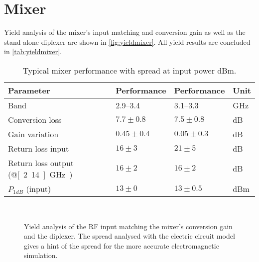 	\section{Mixer}
		Yield analysis of the mixer's input matching and conversion gain as well as the stand-alone diplexer are shown in \autoref{fig:yieldmixer}. All yield results are concluded in \autoref{tab:yieldmixer}.
		
		\begin{table}[hbt!]
			\caption[Mixer performance with spread.]{Typical mixer performance with spread at input power \unit[-2]{dBm}.}
			\label{tab:yieldmixer}
			\centering
			\begin{tabular}{ l l l l } \toprule
				Parameter & Performance & Performance & Unit \\\midrule
				Band & 2.9--3.4 & 3.1--3.3 & GHz \\\midrule
				Conversion loss & $7.7\pm 0.8$ & $7.5\pm 0.8$ & dB \\
				Gain variation & $0.45\pm 0.4$ & $0.05\pm 0.3$ & dB \\
				Return loss input & $16\pm 3$ & $21\pm 5$ & dB \\
				Return loss output (@\unit[2.14]{GHz}) & $16\pm 2$ & $16\pm 2$ & dB \\
				$P_{1dB}$ (input) & $13\pm 0$ & $13\pm 0.5$ & dBm \\\bottomrule
			\end{tabular}
		\end{table}
		
		\begin{figure}[hbt!]
			\centering 
			\\
			\caption[Mixer yield analysis.]{Yield analysis of  the RF input matching  the mixer's conversion gain and  the diplexer. The spread analysed with the electric circuit model gives a hint of the spread for the more accurate electromagnetic simulation.}\label{fig:yieldmixer}
		\end{figure}
		
